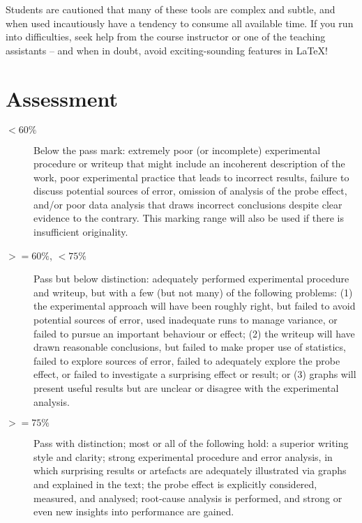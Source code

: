 \documentclass[a4paper,10pt]{article}
\begin{document}
Students are cautioned that many of these tools are complex and subtle, and
when used incautiously have a tendency to consume all available time.
If you run into difficulties, seek help from the course instructor or one of
the teaching assistants -- and when in doubt, avoid exciting-sounding features
in LaTeX!

\section*{Assessment}

\begin{description}
\item[$<60\%$] Below the pass mark: extremely poor (or incomplete)
  experimental procedure or writeup that might include an incoherent
  description of the work, poor experimental practice that leads to incorrect
  results, failure to discuss potential sources of error, omission of analysis
  of the probe effect, and/or poor data analysis that draws incorrect
  conclusions despite clear evidence to the contrary.
  This marking range will also be used if there is insufficient originality.

\item[$>=60\%$, $<75\%$] Pass but below distinction: adequately performed
  experimental procedure and writeup, but with a few (but not many) of the
  following problems:
  (1) the experimental approach will have been roughly right, but failed to
  avoid potential sources of error, used inadequate runs to manage variance,
  or failed to pursue an important behaviour or effect;
  (2) the writeup will have drawn reasonable conclusions, but failed to make
  proper use of statistics, failed to explore sources of error, failed to
  adequately explore the probe effect, or failed to investigate a surprising
  effect or result; or
  (3) graphs will present useful results but are unclear or disagree with the
  experimental analysis.

\item[$>=75\%$] Pass with distinction; most or all of the following hold:
  a superior writing style and clarity; strong experimental procedure and
  error analysis, in which surprising results or artefacts are adequately
  illustrated via graphs and explained in the text; the probe effect is
  explicitly considered, measured, and analysed; root-cause analysis is
  performed, and strong or even new insights into performance are gained.
\end{description}
\end{document}
